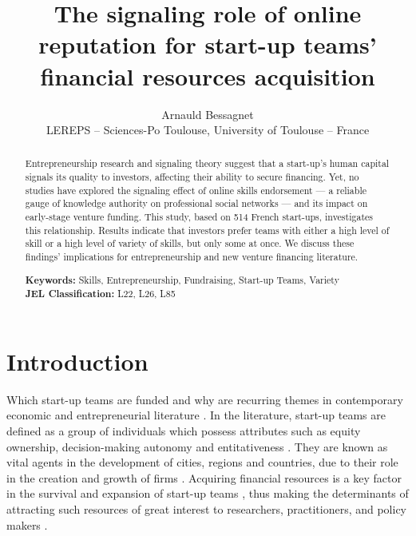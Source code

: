 \documentclass[12pt]{article}
\begin{document}
\title{The signaling role of online reputation for start-up teams' financial resources acquisition}
\date{\vspace{-3ex}}
\author{Arnauld Bessagnet \\ \footnotesize{LEREPS – Sciences-Po Toulouse, University of Toulouse – France} \\}

\maketitle \vspace{-1,5em}

\begin{abstract}
\noindent
Entrepreneurship research and signaling theory suggest that a start-up's human capital signals its quality to investors, affecting their ability to secure financing. Yet, no studies have explored the signaling effect of online skills endorsement — a reliable gauge of knowledge authority on professional social networks — and its impact on early-stage venture funding. This study, based on 514 French start-ups, investigates this relationship. Results indicate that investors prefer teams with either a high level of skill or a high level of variety of skills, but only some at once. We discuss these findings' implications for entrepreneurship and new venture financing literature. \newline

\begin{obeylines}
\noindent \footnotesize{}{\textbf{Keywords:} Skills, Entrepreneurship, Fundraising, Start-up Teams, Variety}
\noindent \footnotesize{\textbf{JEL Classification:} L22, L26, L85}
\end{obeylines}

\end{abstract}

\clearpage
\section{Introduction}

Which start-up teams are funded and why are recurring themes in contemporary economic and entrepreneurial literature \citep{baum2004picking, beckman2007early, bernstein2017attracting, franke2006you, franke2008venture, kaplan2009should, plummer2016better, shane2002network}. In the literature, start-up teams are defined as a group of individuals which possess attributes such as equity ownership, decision-making autonomy and entitativeness \citep{knight2020start}. They are known as vital agents in the development of cities, regions and countries, due to their role in the creation and growth of firms \citep{audretsch2001linking, autio2016entrepreneurship}. Acquiring financial resources is a key factor in the survival and expansion of start-up teams \citep{rosenbusch2013does}, thus making the determinants of attracting such resources of great interest to researchers, practitioners, and policy makers \citep{EUcommission2015digital}.
\end{document}
